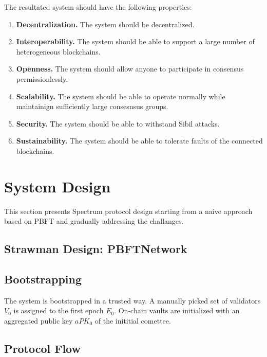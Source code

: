 \documentclass{article}
\begin{document}
    The resultated system should have the following properties:
    \begin{enumerate}
        \item \textbf{Decentralization.} The system should be decentralized.
        \item \textbf{Interoperability.} The system should be able to support a large number of heterogeneous blockchains.
        \item \textbf{Openness.} The system should allow anyone to participate in consensus permissionlessly.
        \item \textbf{Scalability.} The system should be able to operate normally while maintainign sufficiently large consesnsus groups.
        \item \textbf{Security.} The system should be able to withstand Sibil attacks.
        \item \textbf{Sustainability.} The system should be able to tolerate faults of the connected blockchains.
    \end{enumerate}


    \section{System Design}\label{sec:system-design}

    This section presents Spectrum protocol design starting from a naive approach based on PBFT and gradually addressing the challanges.

    \subsection{Strawman Design: PBFTNetwork}\label{subsec:strawman-cross-chain-protocol}

    \subsection{Bootstrapping}\label{subsec:bootstrapping}

    The system is bootstrapped in a trusted way.
    A manually picked set of validators $V_0$ is assigned to the first epoch $E_0$.
    On-chain vaults are initialized with an aggregated public key $aPK_0$ of the inititial comettee.

    \subsection{Protocol Flow}\label{subsec:protocol-flow}
\end{document}
